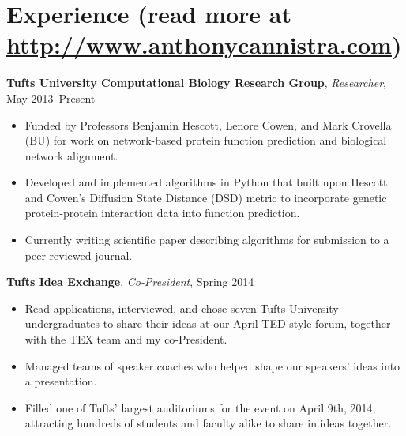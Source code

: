 \documentclass[10pt, letter]{article}
\begin{document}
\vspace{-15pt}
\section*{Experience \textnormal{\small (read more at \url{http://www.anthonycannistra.com})}}
{\bf Tufts University Computational Biology Research Group}, {\em Researcher}, May 2013--Present\\
\vspace*{-.15in} 
\begin{itemize}[topsep=0pt,itemsep=-1pt]
    \item Funded by Professors Benjamin Hescott, Lenore Cowen, and Mark Crovella (BU) for work on network-based protein function prediction and biological network alignment.
    \item Developed and implemented algorithms in Python that built upon Hescott and Cowen's Diffusion State Distance (DSD) metric to incorporate genetic protein-protein interaction data into function prediction.
    \item Currently writing scientific paper describing algorithms for submission to a peer-reviewed journal.
\end{itemize}
\vspace{6pt}
{\bf Tufts Idea Exchange}, {\em Co-President}, Spring 2014\\
\vspace*{-.15in}
\begin{itemize}[topsep=0pt, itemsep=1pt]
  \item Read applications, interviewed, and chose seven Tufts University undergraduates to share their ideas at our April TED-style forum, together with the TEX team and my co-President.
  \item Managed teams of speaker coaches who helped shape our speakers' ideas into a presentation.
  \item Filled one of Tufts' largest auditoriums for the event on April 9th, 2014, attracting hundreds of students and faculty alike to share in ideas together. 
\end{itemize}
\end{document}
